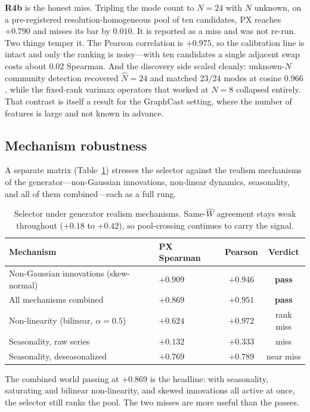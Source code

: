 \textbf{R4b} is the honest miss. Tripling the mode count to $N=24$ with $N$
unknown, on a pre-registered resolution-homogeneous pool of ten candidates, PX
reaches $+0.790$ and misses its bar by $0.010$. It is reported as a miss and was
not re-run. Two things temper it. The Pearson correlation is $+0.975$, so the
calibration line is intact and only the ranking is noisy---with ten candidates a
single adjacent swap costs about $0.02$ Spearman. And the discovery side scaled
cleanly: unknown-$N$ community detection recovered $\hat N = 24$ and matched
$23/24$ modes at cosine $0.966$, while the fixed-rank varimax operators that
worked at $N=8$ collapsed entirely. That contrast is itself a result for the
GraphCast setting, where the number of features is large and not known in advance.

\subsection{Mechanism robustness}

A separate matrix (Table~\ref{tab:robust}) stresses the selector against the
realism mechanisms of the generator---non-Gaussian innovations, non-linear
dynamics, seasonality, and all of them combined---each as a full rung.

\begin{table}[h]
\centering
\small
\begin{tabular}{llcc}
\toprule
Mechanism & PX Spearman & Pearson & Verdict \\
\midrule
Non-Gaussian innovations (skew-normal) & $+0.909$ & $+0.946$ & \textbf{pass} \\
All mechanisms combined                & $+0.869$ & $+0.951$ & \textbf{pass} \\
Non-linearity (bilinear, $\alpha = 0.5$) & $+0.624$ & $+0.972$ & rank miss \\
Seasonality, raw series                & $+0.132$ & $+0.333$ & miss \\
Seasonality, deseasonalized            & $+0.769$ & $+0.789$ & near miss \\
\bottomrule
\end{tabular}
\caption{Selector under generator realism mechanisms. Same-$\hat W$ agreement
stays weak throughout ($+0.18$ to $+0.42$), so pool-crossing continues to carry
the signal.}
\label{tab:robust}
\end{table}

The combined world passing at $+0.869$ is the headline: with seasonality,
saturating and bilinear non-linearity, and skewed innovations all active at once,
the selector still ranks the pool. The two misses are more useful than the passes.

